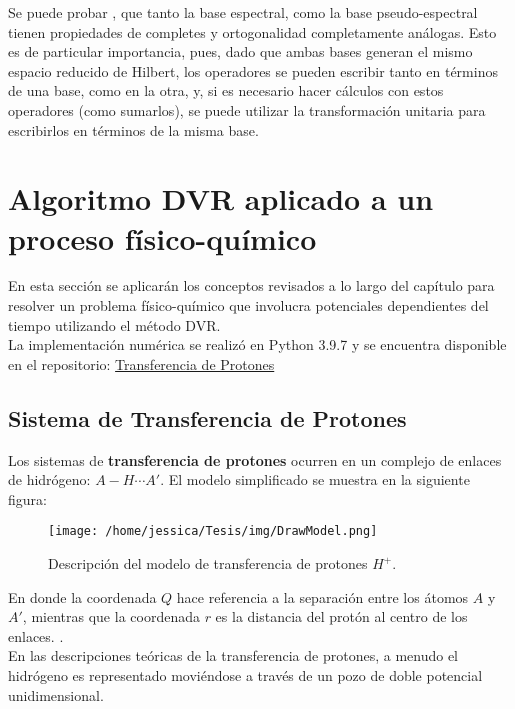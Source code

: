 Se puede probar \cite{Tannor:2006}, que tanto la base espectral, como la base pseudo-espectral tienen propiedades de completes y ortogonalidad completamente análogas. Esto es de particular importancia, pues, dado que ambas bases generan el mismo espacio reducido de Hilbert, los operadores se pueden escribir tanto en términos de una base, como en la otra, y, si es necesario hacer cálculos con estos operadores (como sumarlos), se puede utilizar la transformación unitaria para escribirlos en términos de la misma base.


\section{Algoritmo DVR aplicado a un proceso físico-químico}\label{sec:DVRapp}

En esta sección se aplicarán los conceptos revisados a lo largo del capítulo para resolver un problema físico-químico que involucra potenciales dependientes del tiempo utilizando el método \acs{DVR}.\\
La implementación numérica se realizó en Python 3.9.7 y se encuentra disponible en el repositorio: \href{https://github.com/Jessi-MM/PropagatorLearning/blob/main/src/ANN_as_Propagators_DidacticNotebook.ipynb}{\faGithub Transferencia de Protones}

\subsection{Sistema de Transferencia de Protones}\label{sec:ProtonTransfer}

Los sistemas de \textbf{transferencia de protones} ocurren en un complejo de enlaces de hidrógeno: $A-H\dotsb A'$. El modelo simplificado se muestra en la siguiente figura:

\begin{figure}[ht]
  \centering
\texttt{[image: /home/jessica/Tesis/img/DrawModel.png]}
\caption{Descripción del modelo de transferencia de protones $H^+$.}
\label{fig:drawmodel}
\end{figure}

En donde la coordenada $Q$ hace referencia a la separación entre los átomos $A$ y $A'$, mientras que la coordenada $r$ es la distancia del protón al centro de los enlaces. \cite{DynamicalTheoryPTS}. \\
En las descripciones teóricas de la transferencia de protones, a menudo el hidrógeno es representado moviéndose a través de un pozo de doble potencial unidimensional. \cite{Enzymes}
\\

